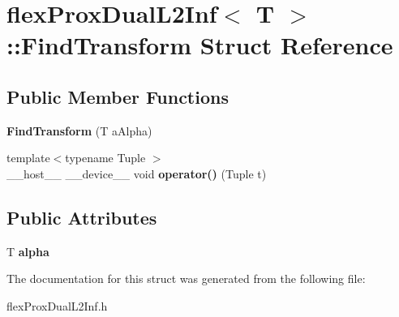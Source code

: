 \hypertarget{structflex_prox_dual_l2_inf_1_1_find_transform}{}\section{flex\+Prox\+Dual\+L2\+Inf$<$ T $>$\+:\+:Find\+Transform Struct Reference}
\label{structflex_prox_dual_l2_inf_1_1_find_transform}
\subsection*{Public Member Functions}
\begin{DoxyCompactItemize}
\item 
\mbox{\label{structflex_prox_dual_l2_inf_1_1_find_transform_a5653d48d8ed14645c0376c592e5f47c5}} 
{\bfseries Find\+Transform} (T a\+Alpha)
\item 
\mbox{\label{structflex_prox_dual_l2_inf_1_1_find_transform_a87655a0d90cdae1bde1a0e3b3d7f6f98}} 
{\footnotesize template$<$typename Tuple $>$ }\\\+\_\+\+\_\+host\+\_\+\+\_\+ \+\_\+\+\_\+device\+\_\+\+\_\+ void {\bfseries operator()} (Tuple t)
\end{DoxyCompactItemize}
\subsection*{Public Attributes}
\begin{DoxyCompactItemize}
\item 
\mbox{\label{structflex_prox_dual_l2_inf_1_1_find_transform_a8289335db5e78c3c1a18c58b68b82720}} 
T {\bfseries alpha}
\end{DoxyCompactItemize}


The documentation for this struct was generated from the following file\+:\begin{DoxyCompactItemize}
\item 
flex\+Prox\+Dual\+L2\+Inf.\+h\end{DoxyCompactItemize}
